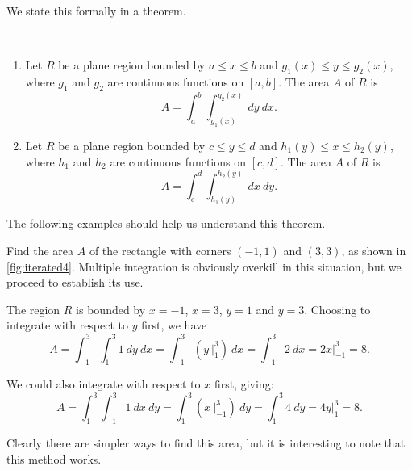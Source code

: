 We state this formally in a theorem.

\begin{theorem}\label{thm:area_plane_region}
\mbox{}\\[-2\baselineskip]\parbox[t]{\linewidth}{%
\begin{enumerate}
	\item Let $R$ be a plane region bounded by $a\leq x\leq b$ and $g_1(x)\leq y\leq g_2(x)$, where $g_1$ and $g_2$ are continuous functions on $[a,b]$. The area $A$ of $R$ is
	\[A = \int_a^b\int_{g_1(x)}^{g_2(x)} \ dy\ dx.\]
	\item Let $R$ be a plane region bounded by $c\leq y\leq d$ and $h_1(y)\leq x\leq h_2(y)$, where $h_1$ and $h_2$ are continuous functions on $[c,d]$. The area $A$ of $R$ is
	\[A = \int_c^d\int_{h_1(y)}^{h_2(y)} \ dx\ dy.\]
\end{enumerate}}
\end{theorem}

The following examples should help us understand this theorem.

\begin{example}\label{ex_iterated4}
Find the area $A$ of the rectangle with corners $(-1,1)$ and $(3,3)$, as shown in \autoref{fig:iterated4}.
\solution
Multiple integration is obviously overkill in this situation, but we proceed to establish its use.


The region $R$ is bounded by $x=-1$, $x=3$, $y=1$ and $y=3$. Choosing to integrate with respect to $y$ first, we have 
\[
 A = \int_{-1}^3\int_1^3 1\ dy\ dx = \int_{-1}^3 \left(y\ \Big|_1^3\right)\ dx
 = \int_{-1}^3 2\ dx = 2x\Big|_{-1}^3=8.
\]

We could also integrate with respect to $x$ first, giving:
\[
 A = \int_1^3\int_{-1}^3 1\ dx \ dy =\int_1^3 \left(x\ \Big|_{-1}^3\right)\ dy
 = \int_1^3 4\ dy = 4y\Big|_1^3 = 8.
\]

Clearly there are simpler ways to find this area, but it is interesting to note that this method works.
\end{example}


